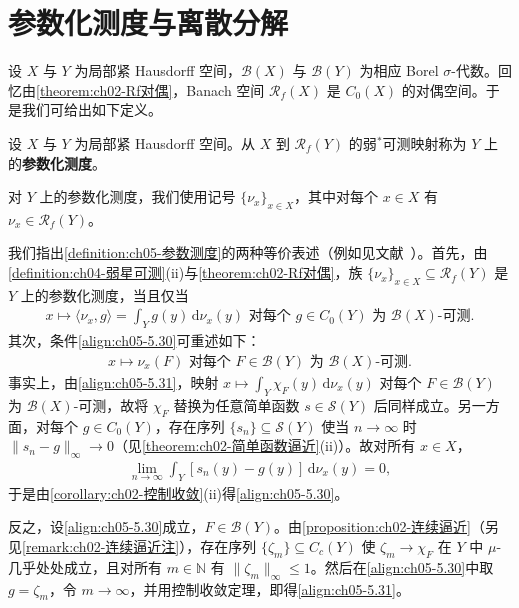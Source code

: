 \documentclass[../../main.tex]{subfiles}%
\begin{document}
\section{参数化测度与离散分解}

设 $X$ 与 $Y$ 为局部紧 Hausdorff 空间，$\mathscr{B}(X)$ 与 $\mathscr{B}(Y)$ 为相应 Borel $\sigma$-代数。回忆由\cref{theorem:ch02-Rf对偶}，Banach 空间 $\mathscr{R}_f(X)$ 是 $C_0(X)$ 的对偶空间。于是我们可给出如下定义。

\begin{definition}\label{definition:ch05-参数测度}
设 $X$ 与 $Y$ 为局部紧 Hausdorff 空间。从 $X$ 到 $\mathscr{R}_f(Y)$ 的弱$^*$可测映射称为 $Y$ 上的\textbf{参数化测度}。

对 $Y$ 上的参数化测度，我们使用记号 $\{\nu_x\}_{x\in X}$，其中对每个 $x\in X$ 有 $\nu_x\in\mathscr{R}_f(Y)$。
\end{definition}

\begin{remark}\label{remark:ch05-参数测度等价}
我们指出\cref{definition:ch05-参数测度}的两种等价表述（例如见文献~\cite{ref05}）。首先，由\cref{definition:ch04-弱星可测}(ii)与\cref{theorem:ch02-Rf对偶}，族 $\{\nu_x\}_{x\in X}\subseteq\mathscr{R}_f(Y)$ 是 $Y$ 上的参数化测度，当且仅当
\begin{align}
x\mapsto\langle\nu_x,g\rangle=\int_Y g(y)\,\mathrm{d}\nu_x(y)
\text{ 对每个 }g\in C_0(Y)\text{ 为 }\mathscr{B}(X)\text{-可测}.\label{align:ch05-5.30}
\end{align}
其次，条件\eqref{align:ch05-5.30}可重述如下：
\begin{align}
x\mapsto\nu_x(F)\text{ 对每个 }F\in\mathscr{B}(Y)\text{ 为 }\mathscr{B}(X)\text{-可测}.\label{align:ch05-5.31}
\end{align}
事实上，由\eqref{align:ch05-5.31}，映射 $x\mapsto\int_Y\chi_F(y)\,\mathrm{d}\nu_x(y)$ 对每个 $F\in\mathscr{B}(Y)$ 为 $\mathscr{B}(X)$-可测，故将 $\chi_F$ 替换为任意简单函数 $s\in\mathcal{S}(Y)$ 后同样成立。另一方面，对每个 $g\in C_0(Y)$，存在序列 $\{s_n\}\subseteq\mathcal{S}(Y)$ 使当 $n\to\infty$ 时 $\|s_n-g\|_\infty\to0$（见\cref{theorem:ch02-简单函数逼近}(ii)）。故对所有 $x\in X$，
\begin{align*}
\lim_{n\to\infty}\int_Y[s_n(y)-g(y)]\,\mathrm{d}\nu_x(y)=0,
\end{align*}
于是由\cref{corollary:ch02-控制收敛}(ii)得\eqref{align:ch05-5.30}。

反之，设\eqref{align:ch05-5.30}成立，$F\in\mathscr{B}(Y)$。由\cref{proposition:ch02-连续逼近}（另见\cref{remark:ch02-连续逼近注}），存在序列 $\{\zeta_m\}\subseteq C_c(Y)$ 使 $\zeta_m\to\chi_F$ 在 $Y$ 中 $\mu$-几乎处处成立，且对所有 $m\in\mathbb{N}$ 有 $\|\zeta_m\|_\infty\leqslant1$。然后在\eqref{align:ch05-5.30}中取 $g=\zeta_m$，令 $m\to\infty$，并用控制收敛定理，即得\eqref{align:ch05-5.31}。
\end{remark}
\end{document}
